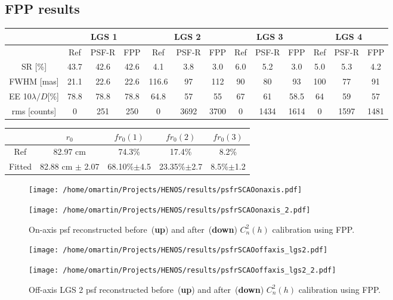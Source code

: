 \documentclass[12pt]{article}
\newcommand{\rz}{r_0}
\newcommand{\cnh}{C_n^2(h)}
\begin{document}
\subsection{FPP results}

\begin{table}
	\centering
	\begin{tabular}{|c|c|c|c|c|c|c|c|c|c|c|c|c|}
		\hline 
		& \multicolumn{3}{c|}{LGS 1} & \multicolumn{3}{c|}{LGS 2} &\multicolumn{3}{c|}{LGS 3} & \multicolumn{3}{c|}{LGS 4} \\
		\hline
		& Ref & PSF-R & FPP & Ref & PSF-R & FPP & Ref & PSF-R & FPP& Ref & PSF-R & FPP\\
		\hline
		SR [\%] 				& 43.7& 42.6 &42.6  &4.1   &3.8  & 3.0 & 6.0& 5.2 &  3.0 & 5.0&5.3 &4.2\\
		\hline
		FWHM [mas]				& 21.1& 22.6 & 22.6 & 116.6& 97	 &  112& 90 & 80  & 93  & 100& 77&91\\
		\hline
		EE 10$\lambda/D$[\%] & 78.8& 78.8 & 78.8 & 64.8 & 57	 &  55& 67 & 61  &   58.5& 64&59 &57\\
		\hline
		rms [counts]			& 0   & 251  & 250 & 0    & 3692&  3700& 0  & 1434&   1614& 0& 1597&1481\\
		\hline
	\end{tabular}
\end{table}

\begin{table}
		\centering
		\begin{tabular}{|c|c|c|c|c|}
			\hline
			& $\rz$ & $fr_0(1)$ & $fr_0(2)$ & $fr_0(3)$ \\
			\hline
			Ref & 82.97 cm & 74.3\%& 17.4\% &8.2\% \\
			\hline
			Fitted & 82.88 cm $\pm$ 2.07& 68.10\%$\pm$4.5 & 23.35\%$\pm$2.7&8.5\%$\pm$1.2 \\
			\hline
		\end{tabular}		
\end{table}

\begin{figure}
	\centering
	\texttt{[image: /home/omartin/Projects/HENOS/results/psfrSCAOonaxis.pdf]}
	\vspace{1cm}
	
	\texttt{[image: /home/omartin/Projects/HENOS/results/psfrSCAOonaxis\_2.pdf]}
	\caption{On-axis psf reconstructed before~(\textbf{up}) and after~(\textbf{down}) $\cnh$ calibration using FPP. }
	\label{F:lgs1}
\end{figure}

\begin{figure}
	\centering
	\texttt{[image: /home/omartin/Projects/HENOS/results/psfrSCAOoffaxis\_lgs2.pdf]}
	\vspace{1cm}
	
	\texttt{[image: /home/omartin/Projects/HENOS/results/psfrSCAOoffaxis\_lgs2\_2.pdf]}
	\caption{Off-axis LGS 2 psf reconstructed before~(\textbf{up}) and after~(\textbf{down}) $\cnh$ calibration using FPP. }
	\label{F:lgs2}
\end{figure}
\end{document}

